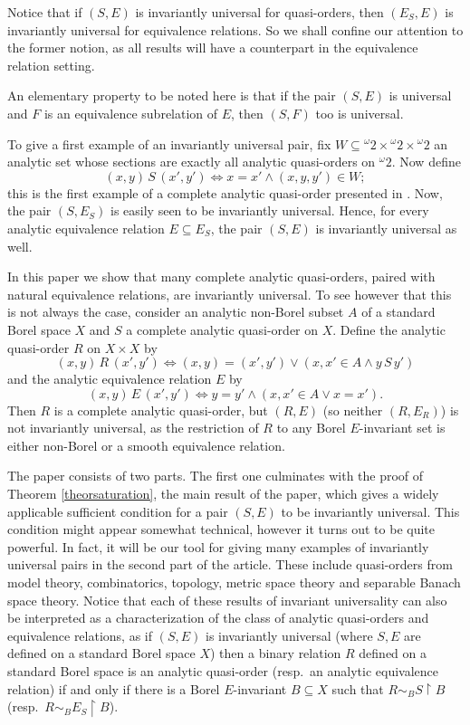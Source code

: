 \documentclass{amsart}
\theoremstyle{definition}
\theoremstyle{remark}
\begin{document}
Notice that if $(S,E)$ is invariantly universal for quasi-orders, then
$(E_S,E)$ is invariantly universal for equivalence relations. So we
shall confine our attention to the former notion, as all results will
have a counterpart in the equivalence relation setting.

An elementary property to be noted here is that if the pair $(S,E)$ is
universal and $F$ is an equivalence subrelation of $E$, then $(S,F)$
too is universal.

To give a first example of an invariantly universal pair, fix $W\subseteq {}^{\omega }2\times {}^{\omega }2\times {}^{\omega }2$ an analytic set whose sections are exactly all analytic quasi-orders on ${}^{\omega }2$.
Now define
$$(x,y)\, S\, (x',y') \iff x=x'\wedge (x,y,y')\in W;$$
this is the first example of a complete analytic quasi-order presented
in \cite{louros}. Now, the pair $(S,E_S)$ is easily seen to be
invariantly universal. Hence, for every analytic equivalence relation
$E\subseteq E_S$, the pair $(S,E)$ is invariantly universal as well.

In this paper we show that many complete analytic quasi-orders, paired with natural equivalence relations, are invariantly universal.
To see however that this is not always the case, consider an analytic non-Borel subset $A$ of a standard Borel space $X$ and $S$ a complete analytic quasi-order on $X$.
Define the analytic quasi-order $R$ on $X\times X$ by
$$(x,y)\, R\, (x',y')\iff (x,y)=(x',y')\vee (x,x'\in A \wedge y\, S\, y')$$
and the analytic equivalence relation $E$ by
$$(x,y)\, E\, (x',y') \iff y=y'\wedge (x,x'\in A \vee x=x').$$
Then $R$ is a complete analytic quasi-order, but $(R,E)$ (so neither $(R,E_R)$) is not invariantly universal, as the restriction of $R$ to any Borel $E$-invariant set is either non-Borel or a smooth equivalence relation.

The paper consists of two parts. The first one culminates with the
proof of Theorem \ref{theorsaturation}, the main result of the paper,
which gives a widely applicable sufficient condition for a pair $(S,E)$
to be invariantly universal. This condition might appear somewhat
technical, however it turns out to be quite powerful. In fact, it will
be our tool for giving many examples of invariantly universal pairs in
the second part of the article. These include quasi-orders from model
theory, combinatorics, topology, metric space theory and separable
Banach space theory. Notice that each of these results of invariant
universality can also be interpreted as a characterization of the class
of analytic quasi-orders and equivalence relations, as if $(S,E)$ is
invariantly universal (where $S,E$ are defined on a standard Borel
space $X$) then a binary relation $R$ defined on a standard Borel space
is an analytic quasi-order (resp.\ an analytic equivalence relation) if
and only if there is a Borel $E$-invariant  $B \subseteq X$ such that
$R \sim_B {S \restriction B}$ (resp.\ $R \sim_B {E_S \restriction B}$).
\end{document}
